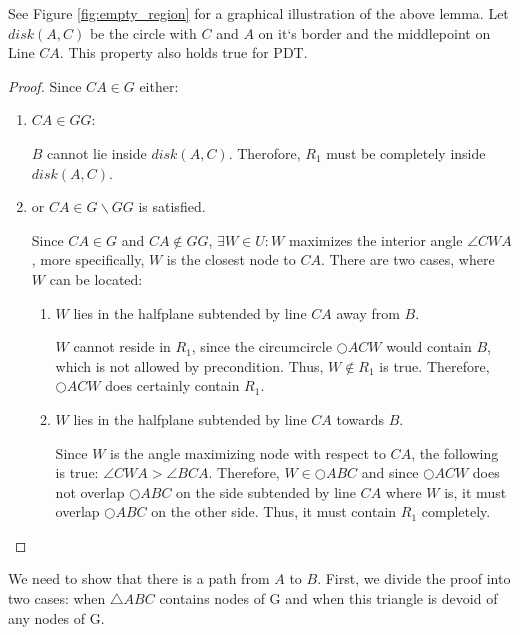 See Figure \ref{fig:empty_region} for a graphical illustration of the above lemma.
Let $disk(A, C) $ be the circle with $C $ and $A $ on it`s border and the middlepoint on Line $CA $.
This property also holds true for PDT.

\begin{proof}
Since $CA \in G $ either: 
\begin{enumerate}
\renewcommand{\labelenumi}{(\roman{enumi})}
\item $CA \in GG $:

$B $ cannot lie inside $disk(A, C) $. 
Therofore, $R_1 $ must be completely inside $disk(A, C) $.
\item or $CA \in G\backslash GG $ is satisfied. 

Since $CA \in G $ and $CA \notin GG $, $\exists W\in U : W$ maximizes the interior angle $\angle{CWA}  $, more specifically, $W $ is the closest node to $CA $.
There are two cases, where $W $ can be located:
\begin{enumerate}
\renewcommand{\labelenumi}{(\alph{enumi})}
\item $W $ lies in the halfplane subtended by line $CA $ away from $B $.

$W $ cannot reside in $R_1 $, since the circumcircle $\bigcirc{ACW} $ would contain $B $, which is not allowed by precondition.
Thus, $W \notin R_1 $ is true.
Therefore, $\bigcirc{ACW} $ does certainly contain $R_1 $.

\item $W $ lies in the halfplane subtended by line $CA $ towards $B $.

Since $W $ is the angle maximizing node with respect to $CA $, the following is true: $\angle{CWA} > \angle{BCA} $.
Therefore, $W \in \bigcirc{ABC} $ and since $\bigcirc{ACW} $ does not overlap $\bigcirc{ABC} $ on the side subtended by line $CA $ where $W $ is, it must overlap $\bigcirc{ABC} $ on the other side.
Thus, it must contain $R_1 $ completely.



\end{enumerate} 


\end{enumerate}


\end{proof} 



We need to show that there is a path from $A $ to $B $.
First, we divide the proof into two cases: when $\triangle{ABC} $ contains nodes of G and when this triangle is devoid of any nodes of G.

